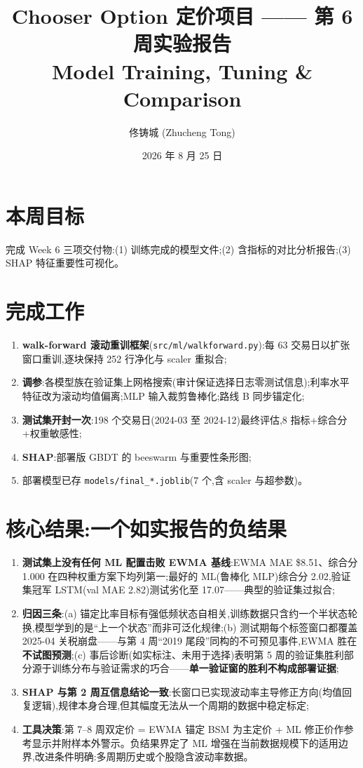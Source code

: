 \documentclass[11pt]{ctexart}
\title{\textbf{Chooser Option 定价项目 —— 第 6 周实验报告}\\
\large Model Training, Tuning \& Comparison}
\author{佟铸城 (Zhucheng Tong)}
\date{2026 年 8 月 25 日}
\begin{document}
\maketitle

\section{本周目标}
完成 Week 6 三项交付物:(1) 训练完成的模型文件;(2) 含指标的对比分析报告;(3) SHAP 特征重要性可视化。

\section{完成工作}
\begin{enumerate}
  \item \textbf{walk-forward 滚动重训框架}(\texttt{src/ml/walkforward.py}):每 63 交易日以扩张窗口重训,逐块保持 252 行净化与 scaler 重拟合;
  \item \textbf{调参}:各模型族在验证集上网格搜索(审计保证选择日志零测试信息);利率水平特征改为滚动均值偏离;MLP 输入裁剪鲁棒化;路线 B 同步锚定化;
  \item \textbf{测试集开封一次}:198 个交易日(2024-03 至 2024-12)最终评估,8 指标+综合分+权重敏感性;
  \item \textbf{SHAP}:部署版 GBDT 的 beeswarm 与重要性条形图;
  \item 部署模型已存 \texttt{models/final\_*.joblib}(7 个,含 scaler 与超参数)。
\end{enumerate}

\section{核心结果:一个如实报告的负结果}
\begin{enumerate}
  \item \textbf{测试集上没有任何 ML 配置击败 EWMA 基线}:EWMA MAE \$8.51、综合分 1.000 在四种权重方案下均列第一;最好的 ML(鲁棒化 MLP)综合分 2.02,验证集冠军 LSTM(val MAE 2.82)测试劣化至 17.07——典型的验证集过拟合;
  \item \textbf{归因三条}:(a) 锚定比率目标有强低频状态自相关,训练数据只含约一个半状态轮换,模型学到的是``上一个状态''而非可泛化规律;(b) 测试期每个标签窗口都覆盖 2025-04 关税崩盘——与第 4 周``2019 尾段''同构的不可预见事件,EWMA 胜在\textbf{不试图预测};(c) 事后诊断(如实标注、未用于选择)表明第 5 周的验证集胜利部分源于训练分布与验证需求的巧合——\textbf{单一验证窗的胜利不构成部署证据};
  \item \textbf{SHAP 与第 2 周互信息结论一致}:长窗口已实现波动率主导修正方向(均值回复逻辑),规律本身合理,但其幅度无法从一个周期的数据中稳定标定;
  \item \textbf{工具决策}:第 7--8 周双定价 = EWMA 锚定 BSM 为主定价 + ML 修正价作参考显示并附样本外警示。负结果界定了 ML 增强在当前数据规模下的适用边界,改进条件明确:多周期历史或个股隐含波动率数据。
\end{enumerate}
\end{document}
